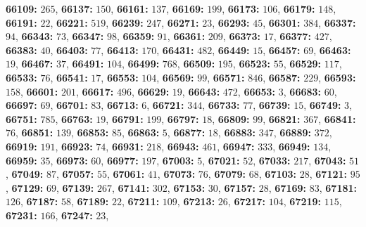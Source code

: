 \textsf{\bfseries 66109:} $265$, \textsf{\bfseries 66137:} $150$, \textsf{\bfseries 66161:} $137$, \textsf{\bfseries 66169:} $199$, \textsf{\bfseries 66173:} $106$, \textsf{\bfseries 66179:} $148$, \textsf{\bfseries 66191:} $22$, \textsf{\bfseries 66221:} $519$, \textsf{\bfseries 66239:} $247$, \textsf{\bfseries 66271:} $23$, \textsf{\bfseries 66293:} $45$, \textsf{\bfseries 66301:} $384$, \textsf{\bfseries 66337:} $94$, \textsf{\bfseries 66343:} $73$, \textsf{\bfseries 66347:} $98$, \textsf{\bfseries 66359:} $91$, \textsf{\bfseries 66361:} $209$, \textsf{\bfseries 66373:} $17$, \textsf{\bfseries 66377:} $427$, \textsf{\bfseries 66383:} $40$, \textsf{\bfseries 66403:} $77$, \textsf{\bfseries 66413:} $170$, \textsf{\bfseries 66431:} $482$, \textsf{\bfseries 66449:} $15$, \textsf{\bfseries 66457:} $69$, \textsf{\bfseries 66463:} $19$, \textsf{\bfseries 66467:} $37$, \textsf{\bfseries 66491:} $104$, \textsf{\bfseries 66499:} $768$, \textsf{\bfseries 66509:} $195$, \textsf{\bfseries 66523:} $55$, \textsf{\bfseries 66529:} $117$, \textsf{\bfseries 66533:} $76$, \textsf{\bfseries 66541:} $17$, \textsf{\bfseries 66553:} $104$, \textsf{\bfseries 66569:} $99$, \textsf{\bfseries 66571:} $846$, \textsf{\bfseries 66587:} $229$, \textsf{\bfseries 66593:} $158$, \textsf{\bfseries 66601:} $201$, \textsf{\bfseries 66617:} $496$, \textsf{\bfseries 66629:} $19$, \textsf{\bfseries 66643:} $472$, \textsf{\bfseries 66653:} $3$, \textsf{\bfseries 66683:} $60$, \textsf{\bfseries 66697:} $69$, \textsf{\bfseries 66701:} $83$, \textsf{\bfseries 66713:} $6$, \textsf{\bfseries 66721:} $344$, \textsf{\bfseries 66733:} $77$, \textsf{\bfseries 66739:} $15$, \textsf{\bfseries 66749:} $3$, \textsf{\bfseries 66751:} $785$, \textsf{\bfseries 66763:} $19$, \textsf{\bfseries 66791:} $199$, \textsf{\bfseries 66797:} $18$, \textsf{\bfseries 66809:} $99$, \textsf{\bfseries 66821:} $367$, \textsf{\bfseries 66841:} $76$, \textsf{\bfseries 66851:} $139$, \textsf{\bfseries 66853:} $85$, \textsf{\bfseries 66863:} $5$, \textsf{\bfseries 66877:} $18$, \textsf{\bfseries 66883:} $347$, \textsf{\bfseries 66889:} $372$, \textsf{\bfseries 66919:} $191$, \textsf{\bfseries 66923:} $74$, \textsf{\bfseries 66931:} $218$, \textsf{\bfseries 66943:} $461$, \textsf{\bfseries 66947:} $333$, \textsf{\bfseries 66949:} $134$, \textsf{\bfseries 66959:} $35$, \textsf{\bfseries 66973:} $60$, \textsf{\bfseries 66977:} $197$, \textsf{\bfseries 67003:} $5$, \textsf{\bfseries 67021:} $52$, \textsf{\bfseries 67033:} $217$, \textsf{\bfseries 67043:} $51$, \textsf{\bfseries 67049:} $87$, \textsf{\bfseries 67057:} $55$, \textsf{\bfseries 67061:} $41$, \textsf{\bfseries 67073:} $76$, \textsf{\bfseries 67079:} $68$, \textsf{\bfseries 67103:} $28$, \textsf{\bfseries 67121:} $95$, \textsf{\bfseries 67129:} $69$, \textsf{\bfseries 67139:} $267$, \textsf{\bfseries 67141:} $302$, \textsf{\bfseries 67153:} $30$, \textsf{\bfseries 67157:} $28$, \textsf{\bfseries 67169:} $83$, \textsf{\bfseries 67181:} $126$, \textsf{\bfseries 67187:} $58$, \textsf{\bfseries 67189:} $22$, \textsf{\bfseries 67211:} $109$, \textsf{\bfseries 67213:} $26$, \textsf{\bfseries 67217:} $104$, \textsf{\bfseries 67219:} $115$, \textsf{\bfseries 67231:} $166$, \textsf{\bfseries 67247:} $23$, 
